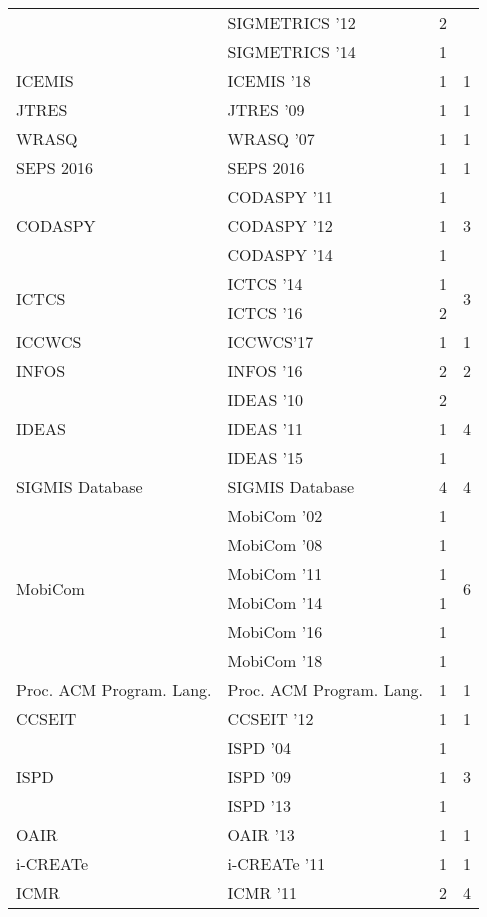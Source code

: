 \begin{table*}[t]
\begin{tabular}{llrr}
& SIGMETRICS '12 & 2 &\\
& SIGMETRICS '14 & 1 &\\
\multirow{1}{*}{ICEMIS } & ICEMIS '18 & 1 & \multirow{1}{*}{1}\\
\multirow{1}{*}{JTRES } & JTRES '09 & 1 & \multirow{1}{*}{1}\\
\multirow{1}{*}{WRASQ } & WRASQ '07 & 1 & \multirow{1}{*}{1}\\
\multirow{1}{*}{SEPS 2016} & SEPS 2016 & 1 & \multirow{1}{*}{1}\\
\multirow{3}{*}{CODASPY } & CODASPY '11 & 1 & \multirow{3}{*}{3}\\
& CODASPY '12 & 1 &\\
& CODASPY '14 & 1 &\\
\multirow{2}{*}{ICTCS } & ICTCS '14 & 1 & \multirow{2}{*}{3}\\
& ICTCS '16 & 2 &\\
\multirow{1}{*}{ICCWCS} & ICCWCS'17 & 1 & \multirow{1}{*}{1}\\
\multirow{1}{*}{INFOS } & INFOS '16 & 2 & \multirow{1}{*}{2}\\
\multirow{3}{*}{IDEAS } & IDEAS '10 & 2 & \multirow{3}{*}{4}\\
& IDEAS '11 & 1 &\\
& IDEAS '15 & 1 &\\
\multirow{1}{*}{SIGMIS Database} & SIGMIS Database & 4 & \multirow{1}{*}{4}\\
\multirow{6}{*}{MobiCom } & MobiCom '02 & 1 & \multirow{6}{*}{6}\\
& MobiCom '08 & 1 &\\
& MobiCom '11 & 1 &\\
& MobiCom '14 & 1 &\\
& MobiCom '16 & 1 &\\
& MobiCom '18 & 1 &\\
\multirow{1}{*}{Proc. ACM Program. Lang.} & Proc. ACM Program. Lang. & 1 & \multirow{1}{*}{1}\\
\multirow{1}{*}{CCSEIT } & CCSEIT '12 & 1 & \multirow{1}{*}{1}\\
\multirow{3}{*}{ISPD } & ISPD '04 & 1 & \multirow{3}{*}{3}\\
& ISPD '09 & 1 &\\
& ISPD '13 & 1 &\\
\multirow{1}{*}{OAIR } & OAIR '13 & 1 & \multirow{1}{*}{1}\\
\multirow{1}{*}{i-CREATe } & i-CREATe '11 & 1 & \multirow{1}{*}{1}\\
\multirow{3}{*}{ICMR } & ICMR '11 & 2 & \multirow{3}{*}{4}\\

\end{tabular}
\end{table*}
